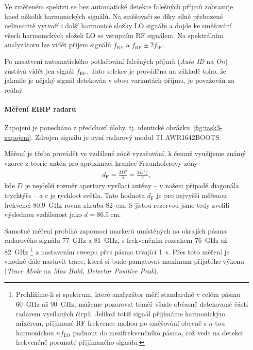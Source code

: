 \documentclass[11pt,a4paper]{article}
\begin{document}
Ve změřeném spektru se bez automatické detekce falešných příjmů zobrazuje hned několik harmonických signálů. Na směšovači se díky silně přebuzené nelinearitě vytvoří i další harmonicé složky LO signálu a dojde ke směšování všech harmonických složek LO se vstupním RF signálem. Na spektrálním analyzátoru lze vidět příjem signálů $f_{\mathrm{RF}}$ a $f_{\mathrm{RF}}\pm2f_{\mathrm{IF}}$.

Po nasatvení automatického potlačování falešných příjmů (\emph{Auto ID} na \emph{On}) zůstává vidět jen signál $f_{\mathrm{RF}}$. Tato selekce je prováděna na základě toho, že jakmile je nějaký signál detekován v obou variantách příjmu, je považován za reálný.

\paragraph*{Měření EIRP radaru} Zapojení je ponecháno z předchozí úlohy, tj. identické obrázku~\ref{fig:task3-zapojeni}. Zdrojen signálu je nyní radarový modul TI AWR1642BOOTS.

Měření je třeba provádět ve vzdálené zóně vyzařování, k čemuž využijeme známý vzorec z teorie antén pro aproximaci hranice Fraunhoferovy zóny
\begin{align}
    \label{eq:farfield}
    d_{\mathrm F} = \frac{2D^2}{\lambda} = \frac{2D^2f}{c},
\end{align}
kde $D$ je nejdelší rozměr apertury vysílací antény -- v našem případě diagonála trychtýře -- a $c$ je rychlost světla. Tato hodnota $d_{\mathrm F}$ je pro nejvyšší měřenou frekvenci 80.9~GHz rovna zhruba 82~cm. S jistou rezervou jsme tedy zvolili výslednou vzdálenost jako $d = 86.5\ \mathrm{cm}$.

Samotné měření probíhá zapomoci markerů umístěných na okrajích pásma radarového signálu 77~GHz a 81~GHz, s frekvenčním rozsahem 76~GHz až 82~GHz%
    \footnote{Prohlížíme-li si spektrum, které analyzátor měří standardně v celém pásmu 60~GHz až 90~GHz, můžeme pozorovat téměř všude občasně detekované části radarem vysílaných čirpů. Jelikož totiž signál přijímáme harmonickým mixérem, přijímané RF frekvence mohou po směšování obecně s $n$-tou harmonickou $nf_{\mathrm{LO}}$ padnout do mezifrekvenčního pásma, což vede na detekci frekvenčně posunuté  přijímaného signálu.}
a nastavením sweepu přes pásmo trvající 1~s. Přes toto měření je vhodné dále nastavit trace, která si bude pamatovat maximum přijatého výkonu (\emph{Trace Mode} na \emph{Max Hold, Detector Positive Peak}).
\end{document}

